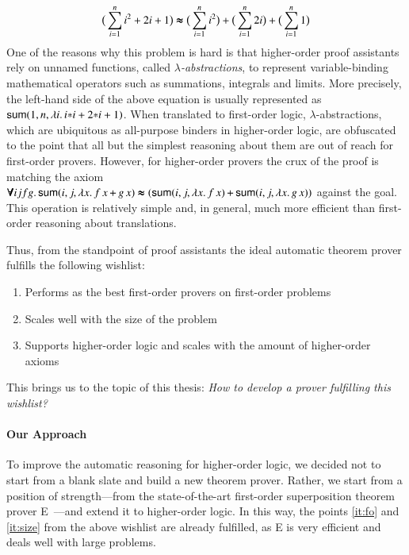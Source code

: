 $$ \big(\sum_{i=1}^{n} i^2 + 2i + 1\big) \pmb{\approx} \big(\sum_{i=1}^{n} i^2\big) +
\big(\sum_{i=1}^{n} 2i\big) + \big(\sum_{i=1}^{n} 1\big) $$ \noindent One of the
reasons why this problem is hard is that higher-order proof assistants rely on
unnamed functions, called \emph{$\lambda$-abstractions}, to represent
variable-binding mathematical operators such as summations, integrals and
limits. More precisely, the left-hand side of the above equation is usually
represented as $\mathsf{sum}(1, n, \lambda i. \, i\mathsf{*}i + 2\mathsf{*}i + 1)$. When
translated to first-order logic, $\lambda$-abstractions, which are ubiquitous as
all-purpose binders in higher-order logic, are obfuscated to the point that all
but the simplest  reasoning about them are out of reach for first-order provers.
However, for higher-order provers the crux of the proof is matching the axiom
$\pmb{\forall} i j f g.\, \mathsf{sum}(i, j, \lambda x. \, f \, x \, \mathsf{+} \, g\,x) \pmb{\approx}
(\mathsf{sum}(i, j, \lambda x. \, f \, x ) \, \mathsf{+} \, \mathsf{sum}(i, j, \lambda x. \, g
\, x ) )$ against the goal. This operation is relatively simple and, in general, much more efficient
than first-order reasoning about translations.


Thus, from the standpoint of proof assistants the ideal
automatic theorem prover fulfills the following wishlist:
\begin{enumerate}
  \item\label{it:fo} Performs as the best first-order provers on first-order problems
  \item\label{it:size} Scales well with the size of the problem
  \item\label{it:ho} Supports higher-order logic and scales with the amount of higher-order axioms
\end{enumerate}
This brings us to the topic of this thesis: \emph{How to develop a prover fulfilling this wishlist?}

\paragraph{Our Approach} To improve the automatic reasoning for higher-order
logic, we decided not to start from a blank slate and build a new theorem prover.
Rather, we start from a position of strength---from the state-of-the-art
first-order superposition theorem prover E~\cite{scv-19-e23}---and extend it to higher-order logic. In this way, the points \ref{it:fo} and
\ref{it:size} from the above wishlist are already fulfilled, as E is very
efficient and deals well with large problems.


